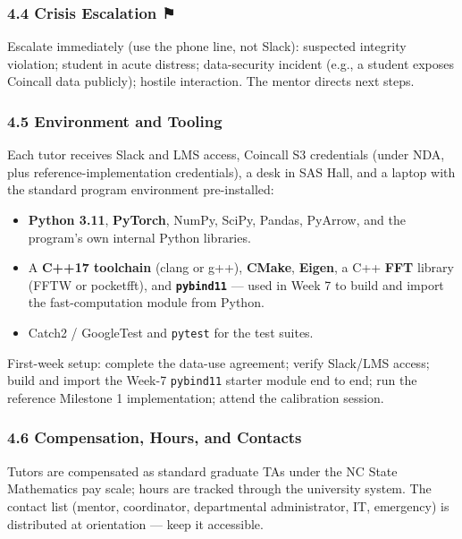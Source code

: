 \documentclass[
]{article}
\providecommand{\tightlist}{%
  \setlength{\itemsep}{0pt}\setlength{\parskip}{0pt}}
\begin{document}
\subsubsection{4.4 Crisis Escalation ⚑}\label{crisis-escalation}

Escalate immediately (use the phone line, not Slack): suspected
integrity violation; student in acute distress; data-security incident
(e.g., a student exposes Coincall data publicly); hostile interaction.
The mentor directs next steps.

\subsubsection{4.5 Environment and
Tooling}\label{environment-and-tooling}

Each tutor receives Slack and LMS access, Coincall S3 credentials (under
NDA, plus reference-implementation credentials), a desk in SAS Hall, and
a laptop with the standard program environment pre-installed:

\begin{itemize}
\tightlist
\item
  \textbf{Python 3.11}, \textbf{PyTorch}, NumPy, SciPy, Pandas, PyArrow,
  and the program's own internal Python libraries.
\item
  A \textbf{C++17 toolchain} (clang or g++), \textbf{CMake},
  \textbf{Eigen}, a C++ \textbf{FFT} library (FFTW or pocketfft), and
  \textbf{\texttt{pybind11}} --- used in Week 7 to build and import the
  fast-computation module from Python.
\item
  Catch2 / GoogleTest and \texttt{pytest} for the test suites.
\end{itemize}

First-week setup: complete the data-use agreement; verify Slack/LMS
access; build and import the Week-7 \texttt{pybind11} starter module end
to end; run the reference Milestone 1 implementation; attend the
calibration session.

\subsubsection{4.6 Compensation, Hours, and
Contacts}\label{compensation-hours-and-contacts}

Tutors are compensated as standard graduate TAs under the NC State
Mathematics pay scale; hours are tracked through the university system.
The contact list (mentor, coordinator, departmental administrator, IT,
emergency) is distributed at orientation --- keep it accessible.
\end{document}
